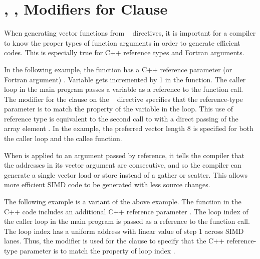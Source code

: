 \section{, ,  Modifiers for  Clause}
\label{sec:linear_modifier}

When generating vector functions from ~ directives, 
it is important for a compiler to know the proper types of function arguments in
order to generate efficient codes.
This is especially true for C++ reference types and Fortran arguments.

In the following example, the function  has a C++ reference
parameter (or Fortran argument) .  Variable  gets incremented by 1 in the function.
The caller loop  in the main program passes 
a variable  as a reference to the function  call.   
The  modifier for the  clause on the 
~ directive specifies that the 
reference-type parameter  is to match the property of the variable 
 in the loop.  
This use of reference type is equivalent to the second call to 
 with a direct passing of the array element .  
In the example, the preferred vector 
length 8 is specified for both the caller loop and the callee function.

When  is applied to an argument passed by reference, 
it tells the compiler that the addresses in its vector argument are consecutive,
and so the compiler can generate a single vector load or store instead of 
a gather or scatter. This allows more efficient SIMD code to be generated with 
less source changes.

\clearpage

 
The following example is a variant of the above example. The function  
in the C++ code includes an additional C++ reference parameter . 
The loop index  of the caller loop  in the main program 
is passed as a reference to the function  call.   
The loop index  has a uniform address with
linear value of step 1 across SIMD lanes. 
Thus, the  modifier is used for the  clause 
to specify that the C++ reference-type parameter  is to match 
the property of loop index .

